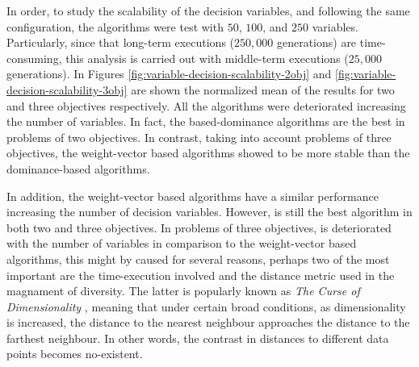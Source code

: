 In order, to study the scalability of the decision variables, and following the same configuration, the algorithms were test with $50$, $100$, and $250$ variables.
%
Particularly, since that long-term executions ($250,000$ generations) are time-consuming, this analysis is carried out with middle-term executions ($25,000$ generations).
%
In Figures \ref{fig:variable-decision-scalability-2obj} and \ref{fig:variable-decision-scalability-3obj} are shown the normalized mean of the \HV{} results for two and three objectives respectively.
%
All the algorithms were deteriorated increasing the number of variables.
%
In fact, the based-dominance algorithms are the best in problems of two objectives.
%
In contrast, taking into account problems of three objectives, the weight-vector based algorithms showed to be more stable than the dominance-based algorithms.

%
In addition, the weight-vector based algorithms have a similar performance increasing the number of decision variables.
%
However, \VSDMOEA{} is still the best algorithm in both two and three objectives.
% 
In problems of three objectives, \VSDMOEA{} is deteriorated with the number of variables in comparison to the weight-vector based algorithms, this might by caused for several reasons, perhaps two of the most important are the time-execution involved and the distance metric used in the magnament of diversity.
%
The latter is popularly known as \textit{The Curse of Dimensionality} \cite{trunk1979problem, beyer1999nearest}, meaning that under certain broad conditions, as dimensionality is increased, the distance to the nearest neighbour approaches the distance to the farthest neighbour.
%
In other words, the contrast in distances to different data points becomes no-existent.


%

%



